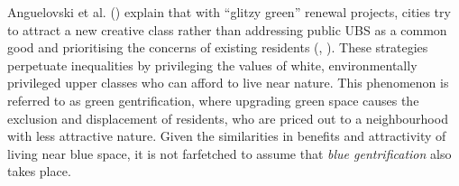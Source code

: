 \documentclass{article}
\begin{document}
Anguelovski et al. (\citeyear{anguelovski2021green}) explain that with ``glitzy green'' renewal projects, cities try to attract a new creative class rather than addressing public UBS as a common good and prioritising the concerns of existing residents (\cite{wessells2014urban}, \cite{anguelovski2020expanding}).
These strategies perpetuate inequalities by privileging the values of white, environmentally privileged upper classes who can afford to live near nature. This phenomenon is referred to as green gentrification, where upgrading green space causes the exclusion and displacement of residents, who are priced out to a neighbourhood with less attractive nature. Given the similarities in benefits and attractivity of living near blue space, it is not farfetched to assume that \textit{blue gentrification} also takes place.

\end{document}
